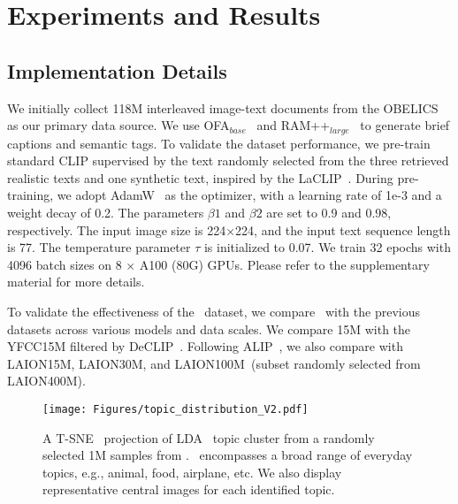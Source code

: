 \section{Experiments and Results}




\subsection{Implementation Details}
We initially collect 118M interleaved image-text documents from the OBELICS~\cite{Obelics} as our primary data source. We use OFA$_{base}$~\cite{OFA} and RAM++$_{large}$~\cite{RAM_plus_plus} to generate brief captions and semantic tags. To validate the dataset performance, we pre-train standard CLIP supervised by the text randomly selected from the three retrieved realistic texts and one synthetic text, inspired by the LaCLIP~\cite{laclip}. During pre-training, we adopt AdamW~\cite{AdamW} as the optimizer, with a learning rate of 1e-3 and a weight decay of 0.2. The parameters $\beta1$ and $\beta2$ are set to 0.9 and 0.98, respectively. The input image size is 224×224, and the input text sequence length is 77. The temperature parameter $\tau$ is initialized to 0.07. We train 32 epochs with 4096 batch sizes on 8 $\times$ A100 (80G) GPUs. Please refer to the supplementary material for more details.

To validate the effectiveness of the \dsname\ dataset, we compare \dsname\ with the previous datasets across various models and data scales. We compare \dsname15M with the YFCC15M filtered by DeCLIP~\cite{DECLIP}. Following ALIP~\cite{ALIP}, we also compare with LAION15M, LAION30M, and LAION100M~(subset randomly selected from LAION400M).


\begin{figure*}[t!]
    \centering
    \texttt{[image: Figures/topic\_distribution\_V2.pdf]}
    \vspace{-6mm}
    \caption{A T-SNE~\cite{tsne} projection of LDA~\cite{LDA} topic cluster from a randomly selected 1M samples from \dsname. \dsname\ encompasses a broad range of everyday topics, e.g., animal, food, airplane, etc. We also display representative central images for each identified topic.}
    \vspace{-2mm}
    \label{fig: dataset_topic_distribution}
\end{figure*}

